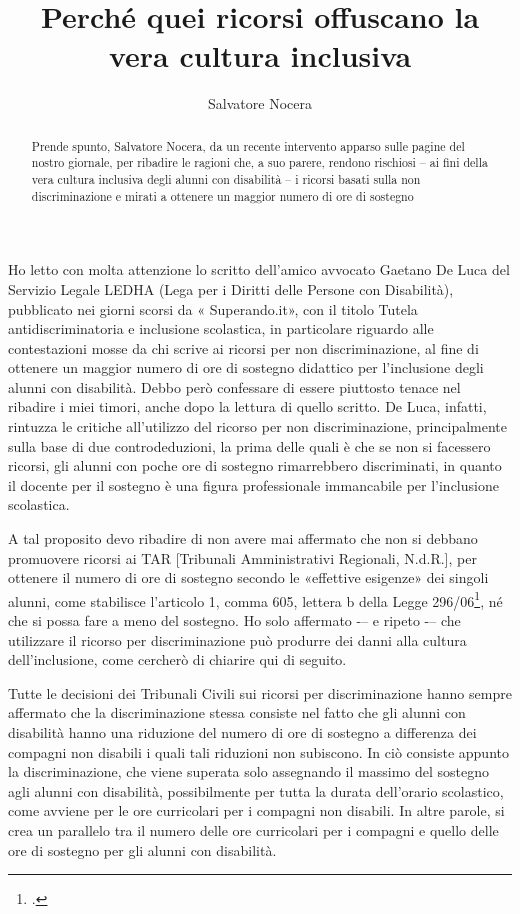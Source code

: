 \author{Salvatore Nocera}
\title{Perché quei ricorsi offuscano la vera cultura inclusiva}
\label{cha:salvatorenocera210114}
\begin{abstract}
Prende spunto, Salvatore Nocera, da un recente intervento apparso sulle pagine del nostro giornale, per ribadire le ragioni che, a suo parere, rendono rischiosi – ai fini della vera cultura inclusiva degli alunni con disabilità – i ricorsi basati sulla non discriminazione e mirati a ottenere un maggior numero di ore di sostegno
\end{abstract}
\maketitle
{}
Ho letto con molta attenzione lo scritto dell'amico avvocato Gaetano De Luca del Servizio Legale LEDHA (Lega per i Diritti delle Persone con Disabilità), pubblicato nei giorni scorsi da « Superando.it», con il titolo Tutela antidiscriminatoria e inclusione scolastica\pageref{cha:DeLuca140113}, in particolare riguardo alle contestazioni mosse da chi scrive ai ricorsi per non discriminazione, al fine di ottenere un maggior numero di ore di sostegno didattico per l'inclusione degli alunni con disabilità.
Debbo però confessare di essere piuttosto tenace nel ribadire i miei timori, anche dopo la lettura di quello scritto. De Luca, infatti, rintuzza le critiche all'utilizzo del ricorso per non discriminazione, principalmente sulla base di due controdeduzioni, la prima delle quali è che se non si facessero ricorsi, gli alunni con poche ore di sostegno rimarrebbero discriminati, in quanto il docente per il sostegno è una figura professionale immancabile per l'inclusione scolastica.

A tal proposito devo ribadire di non avere mai affermato che non si debbano promuovere ricorsi ai TAR [Tribunali Amministrativi Regionali, N.d.R.], per ottenere il numero di ore di sostegno secondo le «effettive esigenze» dei singoli alunni, come stabilisce l'articolo 1, comma 605, lettera b della Legge 296/06\footcite{Legge_296_2006}, né che si possa fare a meno del sostegno. Ho solo affermato -– e ripeto -– che utilizzare il ricorso per discriminazione può produrre dei danni alla cultura dell'inclusione, come cercherò di chiarire qui di seguito.

Tutte le decisioni dei Tribunali Civili sui ricorsi per discriminazione hanno sempre affermato che la discriminazione stessa consiste nel fatto che gli alunni con disabilità hanno una riduzione del numero di ore di sostegno a differenza dei compagni non disabili i quali tali riduzioni non subiscono. In ciò consiste appunto la discriminazione, che viene superata solo assegnando il massimo del sostegno agli alunni con disabilità, possibilmente per tutta la durata dell'orario scolastico, come avviene per le ore curricolari per i compagni non disabili. In altre parole, si crea un parallelo tra il numero delle ore curricolari per i compagni e quello delle ore di sostegno per gli alunni con disabilità.

